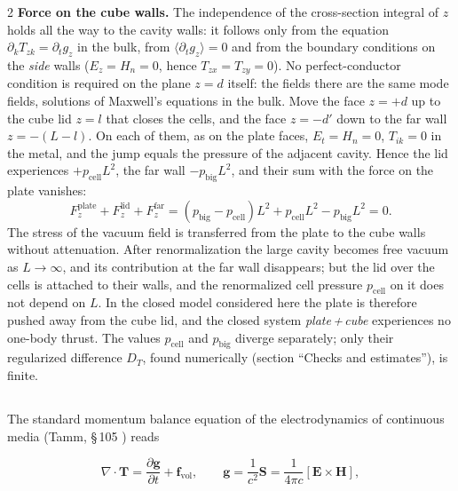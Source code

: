 \documentclass[twoside, 10pt]{article}
\def\myvspacebeforesubsection{-2.0mm}
\def\myvspaceaftersubsection{-2.5mm}
\begin{document}
\begin{multicols}{2}
\textbf{Force on the cube walls.} The independence of the cross-section integral of \(z\) holds all the way to the cavity walls: it follows only from the equation \(\partial_kT_{zk}=\partial_tg_z\) in the bulk, from \(\langle\partial_tg_z\rangle=0\) and from the boundary conditions on the \emph{side} walls (\(E_z=H_n=0\), hence \(T_{zx}=T_{zy}=0\)). No perfect-conductor condition is required on the plane \(z=d\) itself: the fields there are the same mode fields, solutions of Maxwell's equations in the bulk. Move the face \(z=+d\) up to the cube lid \(z=l\) that closes the cells, and the face \(z=-d'\) down to the far wall \(z=-(L-l)\). On each of them, as on the plate faces, \(E_t=H_n=0\), \(T_{ik}=0\) in the metal, and the jump equals the pressure of the adjacent cavity. Hence the lid experiences \(+p_{\text{cell}}L^2\), the far wall \(-p_{\text{big}}L^2\), and their sum with the force on the plate vanishes:
\[
F_z^{\text{plate}}+F_z^{\text{lid}}+F_z^{\text{far}}=(p_{\text{big}}-p_{\text{cell}})L^2+p_{\text{cell}}L^2-p_{\text{big}}L^2=0 .
\]
The stress of the vacuum field is transferred from the plate to the cube walls without attenuation. After renormalization the large cavity becomes free vacuum as \(L\to\infty\), and its contribution at the far wall disappears; but the lid over the cells is attached to their walls, and the renormalized cell pressure \(p_{\text{cell}}\) on it does not depend on \(L\). In the closed model considered here the plate is therefore pushed away from the cube lid, and the closed system \emph{plate\,+\,cube} experiences no one-body thrust. The values \(p_{\text{cell}}\) and \(p_{\text{big}}\) diverge separately; only their regularized difference \(D_T\), found numerically (section ``Checks and estimates''), is finite.

\vspace{\myvspacebeforesubsection}
\subsection*{}
\vspace{\myvspaceaftersubsection}


The standard momentum balance equation of the electrodynamics of continuous media (Tamm, \S\,105
\cite{Tamm1957}) reads

\end{multicols}
\[
\nabla\cdot\mathbf{T} = \frac{\partial\mathbf{g}}{\partial t} + \mathbf{f}_{\mathrm{vol}},
\qquad
\mathbf{g} = \frac{1}{c^2}\mathbf{S} = \frac{1}{4\pi c}[\mathbf{E}\times\mathbf{H}],
\]
\end{document}
